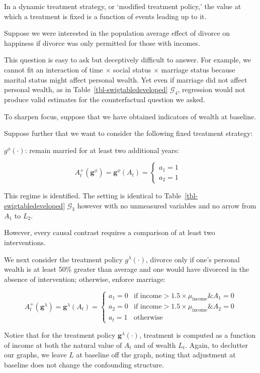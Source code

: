 \documentclass[
  single column]{article}
\begin{document}
In a dynamic treatment strategy, or `modified treatment policy,' the
value at which a treatment is fixed is a function of events leading up
to it.

Suppose we were interested in the population average effect of divorce
on happiness if divorce was only permitted for those with incomes.

This question is easy to ask but deceptively difficult to answer. For
example, we cannot fit an interaction of time \(\times\) social status
\(\times\) marriage status because marital status might affect personal
wealth. Yet even if marriage did not affect personal wealth, as in
Table~\ref{tbl-swigtabledeveloped} \(\mathcal{G}_4\), regression would
not produce valid estimates for the counterfactual question we asked.

To sharpen focus, suppose that we have obtained indicators of wealth at
baseline.

Suppose further that we want to consider the following fixed treatment
strategy:

\(g^\phi(\cdot)\): remain married for at least two additional years:

\[
A_t^{+}(\mathbf{g}^\phi) = \mathbf{g}^\phi (A_{t}) = \begin{cases} 
   a_{1} = 1 & \\ 
   a_{2} = 1 &   
\end{cases}
\]

This regime is identified. The setting is identical to
Table~\ref{tbl-swigtabledeveloped} \(\mathcal{G}_3\) however with no
unmeasured variables and no arrow from \(A_1\) to \(L_2\).

However, every causal contrast requires a comparison of at least two
interventions.

We next consider the treatment policy \(g^{\lambda}(\cdot)\), divorce
only if one's personal wealth is at least 50\% greater than average and
one would have divorced in the absence of intervention; otherwise,
enforce marriage:

\[
A_t^{+}(\mathbf{g}^{\lambda}) = \mathbf{g}^{\lambda}(A_{t}) = \begin{cases} 
   a_{1} = 0 & \text{if income} > 1.5 \times  \mu_{\text{income}} \& A_1 = 0 \\ 
   a_{2} = 0 & \text{if income} > 1.5 \times  \mu_{\text{income}} \& A_2 = 0 \\ 
   a_{t} = 1 & \text{otherwise} 
\end{cases}
\]

Notice that for the treatment policy \(\mathbf{g}^\lambda(\cdot)\),
treatment is computed as a function of income at both the natural value
of \(A_t\) and of wealth \(L_t\). Again, to declutter our graphs, we
leave \(L\) at baseline off the graph, noting that adjustment at
baseline does not change the confounding structure.
\end{document}
